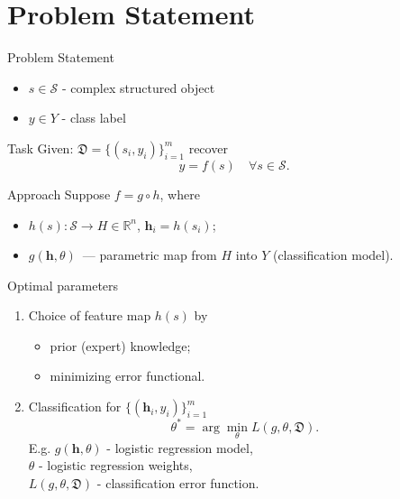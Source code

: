 \documentclass{beamer}
\begin{document}
\section{Problem Statement}
\begin{frame}{Problem Statement}
	\begin{itemize}
		\item $s \in \mathcal{S}$ - complex structured object
		\item $y \in Y$ - class label
	\end{itemize}
	\begin{block}{Task}
	Given: $\mathfrak{D} = \{(s_i, y_i)\}_{i=1}^m$ recover
	\[
		y = f(s) \quad \forall s \in \mathcal{S}.
	\]
	\end{block}
	\begin{block}{Approach}
		Suppose $f = g \circ h$, where
		\begin{itemize}
			\item $h(s): \mathcal{S} \rightarrow H \in \mathbb{R}^n$,  $\mathbf{h}_i = h(s_i)$;
			\item $g(\mathbf{h}, \theta)$~--- parametric map from $H$ into $Y$ (classification model).
		\end{itemize}
	\end{block}
\end{frame}
\begin{frame}{Optimal parameters}
	\begin{enumerate}
		\item Choice of feature map $h(s)$ by 
		\begin{itemize}
			\item prior (expert) knowledge;
			\item minimizing error functional.
		\end{itemize}
		
		\item Classification for $\{(\mathbf{h}_i , y_i)\}_{i=1}^m$
		\[
			\mathbb{\theta}^* = \arg \min_{\theta} L(g, \theta, \mathfrak{D}).
		\]
		E.g. 
			$g(\mathbf{h}, \theta)$ - logistic regression model, \\ \hspace{0.7cm}
			$\theta$ - logistic regression weights, \\ \hspace{0.7cm}
			$L (g, \theta, \mathfrak{D})$ - classification error function.
		
	\end{enumerate}

\end{frame}
\end{document}
